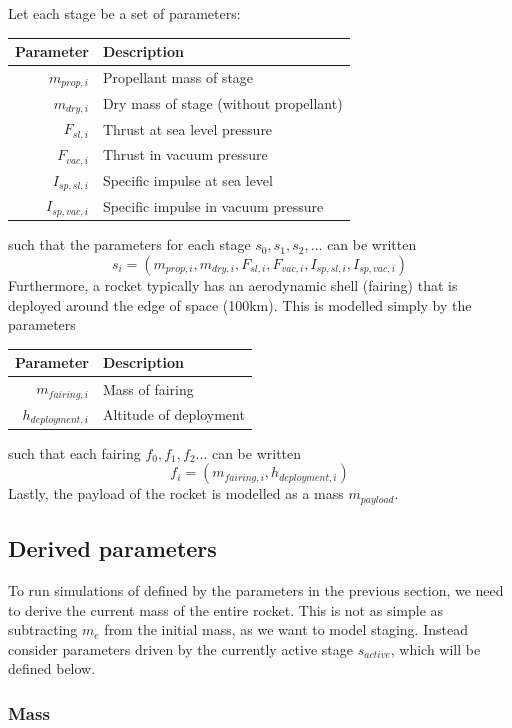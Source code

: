 \documentclass[11pt]{article}
\begin{document}
Let each stage be a set of parameters:
\begin{center}
\begin{tabular}{ r  | l  }
  Parameter & Description \\
  \hline
  $m_{prop,i}$ & Propellant mass of stage \\
  $m_{dry,i}$ & Dry mass of stage (without propellant) \\
  $F_{sl,i}$ & Thrust at sea level pressure \\
  $F_{vac,i}$ & Thrust in vacuum pressure \\
  $I_{sp,sl,i}$ & Specific impulse at sea level \\
  $I_{sp,vac,i}$ & Specific impulse in vacuum pressure
\end{tabular}
\end{center}
such that the parameters for each stage $s_0,s_1,s_2,...$ can be written
$$
s_i = (m_{prop,i}, m_{dry,i}, F_{sl,i}, F_{vac,i}, I_{sp,sl,i}, I_{sp,vac,i})
$$
Furthermore, a rocket typically has an aerodynamic shell (fairing) that is deployed around the edge of space (100km). This is modelled simply by the parameters
\begin{center}
  \begin{tabular}{ r  | l  }
    Parameter & Description \\
    \hline
    $m_{fairing,i}$ & Mass of fairing \\
    $h_{deployment,i}$ & Altitude of deployment
  \end{tabular}
\end{center}
such that each fairing $f_0,f_1,f_2...$ can be written
$$
f_i = (m_{fairing,i}, h_{deployment,i})
$$
Lastly, the payload of the rocket is modelled as a mass $m_{payload}$. 


\subsection{Derived parameters}
To run simulations of defined by the parameters in the previous section, 
we need to derive the current mass of the entire rocket. This is not as simple as subtracting $m_e$ from the initial mass, as we want to model staging.
Instead consider parameters driven by the currently active stage $s_{active}$, which will be defined below.

\subsubsection{Mass}
\end{document}
